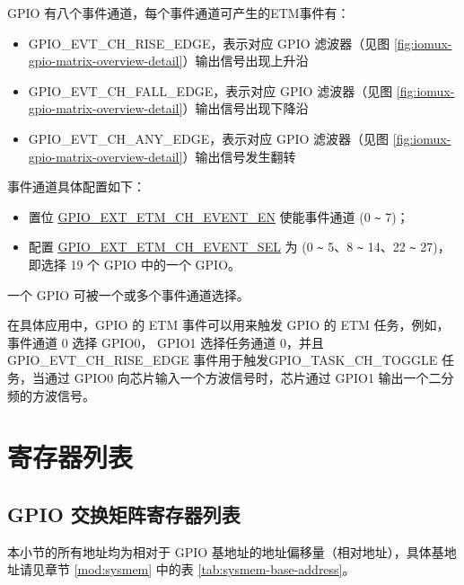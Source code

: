 \documentclass[main\_\_CN.tex]{subfiles}
\begin{document}
GPIO 有八个事件通道，每个事件通道可产生的ETM事件有：

\begin{itemize}
    \item GPIO\_EVT\_CH\_RISE\_EDGE，表示对应 GPIO 滤波器（见图 \ref{fig:iomux-gpio-matrix-overview-detail}）输出信号出现上升沿
    \item GPIO\_EVT\_CH\_FALL\_EDGE，表示对应 GPIO 滤波器（见图 \ref{fig:iomux-gpio-matrix-overview-detail}）输出信号出现下降沿
    \item GPIO\_EVT\_CH\_ANY\_EDGE，表示对应 GPIO 滤波器（见图 \ref{fig:iomux-gpio-matrix-overview-detail}）输出信号发生翻转
\end{itemize}

事件通道具体配置如下：

\begin{itemize}
    \item 置位 \hyperref[fielddesc:GPIOSDETMCH0EVENTEN]{GPIO\_EXT\_ETM\_CH\_EVENT\_EN} 使能事件通道  (0 \verb+~+ 7)；
    \item 配置 \hyperref[fielddesc:GPIOSDETMCH0EVENTSEL]{GPIO\_EXT\_ETM\_CH\_EVENT\_SEL} 为  (0 \verb+~+ 5、8 \verb+~+ 14、22 \verb+~+ 27)，即选择 19 个 GPIO 中的一个 GPIO。
\end{itemize}

\begin{tiplisting}
一个 GPIO 可被一个或多个事件通道选择。
\end{tiplisting}

在具体应用中，GPIO 的 ETM 事件可以用来触发 GPIO 的 ETM 任务，例如，事件通道 0 选择 GPIO0， GPIO1 选择任务通道 0，并且 GPIO\_EVT\_CH\_RISE\_EDGE 事件用于触发GPIO\_TASK\_CH\_TOGGLE 任务，当通过 GPIO0 向芯片输入一个方波信号时，芯片通过 GPIO1 输出一个二分频的方波信号。



\clearpage
\hypertarget{iomuxgpio-reg-summ}{}
\section{寄存器列表}
\subsection{GPIO 交换矩阵寄存器列表}
本小节的所有地址均为相对于 GPIO 基地址的地址偏移量（相对地址），具体基地址请见章节 \ref{mod:sysmem} \textit{} 中的表 \ref{tab:sysmem-base-address}。
\end{document}
